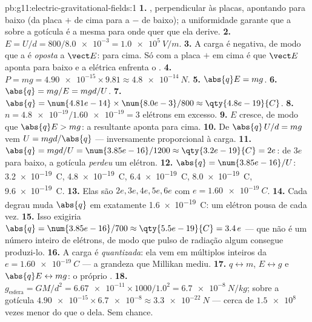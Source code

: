 \begin{solution}{pb:g11:electric-gravitational-fields:1}
\textbf{1.} , perpendicular às placas, apontando para baixo (da
placa $+$ de cima para a $-$ de baixo); a uniformidade garante que a
 sobre a gotícula é a mesma para onde quer que ela derive.
\textbf{2.} $E = U/d = 800 / \num{8.0e-3} = \qty{1.0e5}{V/m}$.
\textbf{3.} A carga é negativa, de modo que a  é \emph{oposta} a
$\vect E$: para cima. Só com a placa $+$ em cima é que $\vect E$ aponta
para baixo e a  elétrica enfrenta o .
\textbf{4.} $P = mg = \num{4.90e-15} \times 9.81 \approx
\qty{4.8e-14}{N}$.
\textbf{5.} $\abs{q}E = mg$.
\textbf{6.} $\abs{q} = mg/E = mgd/U$.
\textbf{7.} $\abs{q} = \num{4.81e-14} \times \num{8.0e-3} / 800
\approx \qty{4.8e-19}{C}$.
\textbf{8.} $n = \num{4.8e-19} / \num{1.60e-19} = 3$ elétrons em
excesso.
\textbf{9.} $E$ cresce, de modo que $\abs{q}E > mg$: a  resultante
aponta para cima.
\textbf{10.} De $\abs{q}\,U/d = mg$ vem $U = mgd/\abs{q}$ ---
inversamente proporcional à carga.
\textbf{11.} $\abs{q} = mgd/U = \num{3.85e-16}/1200 \approx
\qty{3.2e-19}{C} = 2e$: de $3e$ para baixo, a gotícula \emph{perdeu} um
elétron.
\textbf{12.} $\abs{q} = \num{3.85e-16}/U$: \qty{3.2e-19}{C},
\qty{4.8e-19}{C}, \qty{6.4e-19}{C}, \qty{8.0e-19}{C},
\qty{9.6e-19}{C}.
\textbf{13.} Elas são $2e, 3e, 4e, 5e, 6e$ com
$e = \qty{1.60e-19}{C}$.
\textbf{14.} Cada degrau muda $\abs{q}$ em exatamente
\qty{1.6e-19}{C}: um elétron pousa de cada vez.
\textbf{15.} Isso exigiria $\abs{q} = \num{3.85e-16}/700 \approx
\qty{5.5e-19}{C} = 3.4\,e$ --- que não é um número inteiro de elétrons,
de modo que pulso de radiação algum consegue produzi-lo.
\textbf{16.} A carga é \emph{quantizada}: ela vem em múltiplos inteiros
da  $e = \qty{1.60e-19}{C}$ --- a grandeza que Millikan
mediu.
\textbf{17.} $q \leftrightarrow m$, $E \leftrightarrow g$ e
$\abs{q}E \leftrightarrow mg$: o próprio .
\textbf{18.} $g_{\text{esfera}} = GM/d^2 = \num{6.67e-11} \times 1000 /
1.0^2 = \qty{6.7e-8}{N/kg}$;  sobre a gotícula
$\num{4.90e-15} \times \num{6.7e-8} \approx \qty{3.3e-22}{N}$ --- cerca
de $\num{1.5e8}$ vezes menor do que o  dela. Sem chance.

\end{solution}
